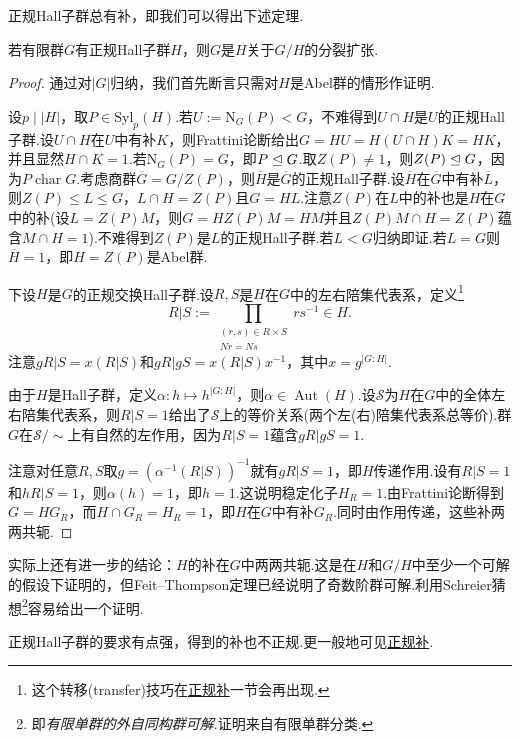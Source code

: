 正规Hall子群总有补，即我们可以得出下述定理.
\begin{thm}
	\par 若有限群$G$有正规Hall子群$H$，则$G$是$H$关于$G/H$的分裂扩张.\hypertarget{thm:SchurZassenhaus}{}
\end{thm}
\begin{proof}
	通过对$|G|$归纳，我们首先断言只需对$H$是Abel群的情形作证明.

	设$p\mid|H|$，取$P\in\mathrm{Syl}_p(H)$.若$U:=\mathrm{N}_G(P)<G$，不难得到$U\cap H$是$U$的正规Hall子群.设$U\cap H$在$U$中有补$K$，则Frattini论断给出$G=HU=H(U\cap H)K=HK$，并且显然$H\cap K=1$.若$\mathrm{N}_G(P)=G$，即$P\trianglelefteq G$.取$Z(P)\ne 1$，则$Z(P)\trianglelefteq G$，因为$P\operatorname*{char} G$.考虑商群$\overline{G}=G/Z(P)$，则$\overline{H}$是$\overline{G}$的正规Hall子群.设$\overline{H}$在$\overline{G}$中有补$\overline{L}$，则$Z(P)\le L\le G$，$L\cap H=Z(P)$且$G=HL$.注意$Z(P)$在$L$中的补也是$H$在$G$中的补(设$L=Z(P)M$，则$G=HZ(P)M=HM$并且$Z(P)M\cap H=Z(P)$蕴含$M\cap H=1$).不难得到$Z(P)$是$L$的正规Hall子群.若$L<G$归纳即证.若$L=G$则$\overline{H}=1$，即$H=Z(P)$是Abel群.

	下设$H$是$G$的正规交换Hall子群.设$R,S$是$H$在$G$中的左右陪集代表系，定义\footnote{这个转移(transfer)技巧在\hyperlink{subsec:NormalComplement}{正规补}一节会再出现.}
	\[
		R|S:=\prod_{\substack{(r,s)\in R\times S\\ Nr=Ns}}rs^{-1}\in H.
	\]
	注意$gR|S=x(R|S)$和$gR|gS=x(R|S)x^{-1}$，其中$x=g^{|G:H|}$.

	由于$H$是Hall子群，定义$\alpha\colon h\mapsto h^{|G:H|}$，则$\alpha\in\operatorname*{Aut}(H)$.设$\mathcal{S}$为$H$在$G$中的全体左右陪集代表系，则$R|S=1$给出了$\mathcal{S}$上的等价关系(两个左(右)陪集代表系总等价).群$G$在$\mathcal{S}/\sim$上有自然的左作用，因为$R|S=1$蕴含$gR|gS=1$.

	注意对任意$R,S$取$g=(\alpha^{-1}(R|S))^{-1}$就有$gR|S=1$，即$H$传递作用.设有$R|S=1$和$hR|S=1$，则$\alpha(h)=1$，即$h=1$.这说明稳定化子$H_R=1$.由Frattini论断得到$G=HG_R$，而$H\cap G_R=H_R=1$，即$H$在$G$中有补$G_R$.同时由作用传递，这些补两两共轭.
\end{proof}
\begin{remark}
	实际上还有进一步的结论：{\heiti $H$的补在$G$中两两共轭}.这是在$H$和$G/H$中至少一个可解的假设下证明的，但Feit--Thompson定理已经说明了奇数阶群可解.利用Schreier猜想\footnote{即\emph{有限单群的外自同构群可解}.证明来自有限单群分类.}容易给出一个证明.
\end{remark}

正规Hall子群的要求有点强，得到的补也不正规.更一般地可见\hyperlink{subsec:NormalComplement}{正规补}.

